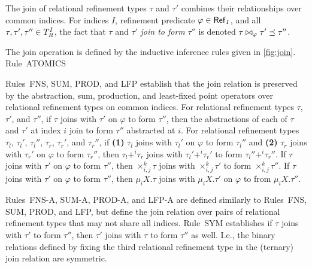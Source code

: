 The join of relational refinement types $\tau$ and $\tau'$ combines
their relationships over common indices.
%
For indices $I$, refinement predicate $\varphi \in \mathsf{Ref}_{I}$, and
all $\tau, \tau', \tau'' \in T_{R}^{I}$, the fact that $\tau$ and
$\tau'$ \emph{join to form} $\tau''$ is denoted
$\tau \bowtie_{ \varphi } \tau' \preceq \tau''$.

The join operation is defined by the inductive inference rules given
in \autoref{fig:join}.
Rule~ATOMICS
%

Rules~FNS, SUM, PROD, and LFP establish that the join relation is
preserved by the abstraction, sum, production, and least-fixed point
operators over relational refinement types on common indices.
%
For relational refinement types $\tau$, $\tau'$, and $\tau''$, if
$\tau$ joins with $\tau'$ on $\varphi$ to form $\tau''$, then the
abstractions of each of $\tau$ and $\tau'$ at index $i$ join to form
$\tau''$ abstracted at $i$.
For relational refinement types $\tau_l$, $\tau_l'$, $\tau_l''$,
$\tau_r$, $\tau_r'$, and $\tau_r''$, if %
\textbf{(1)} $\tau_l$ joins with $\tau_l'$ on $\varphi$ to form
$\tau_l''$ and %
\textbf{(2)} $\tau_r$ joins with $\tau_r'$ on $\varphi$ to form
$\tau_r''$, then $\tau_l +^i \tau_r$ joins with $\tau_l' +^i \tau_r'$
to form $\tau_l'' +^i \tau_r''$.
If $\tau$ joins with $\tau'$ on $\varphi$ to form $\tau''$, then %
$\times_{i, j}^k \tau$ joins with $\times_{i, j}^k \tau'$ to form
$\times_{i, j}^k \tau''$.
If $\tau$ joins with $\tau'$ on $\varphi$ to form $\tau''$, then %
$\mu_i X. \tau$ joins with $\mu_i X. \tau'$ on $\varphi$ to from
$\mu_i X. \tau''$.

Rules~FNS-A, SUM-A, PROD-A, and LFP-A are defined similarly to
Rules~FNS, SUM, PROD, and LFP, but define the join relation over pairs
of relational refinement types that may not share all indices.
%
Rule~SYM establishes if $\tau$ joins with $\tau'$ to form $\tau''$,
then $\tau'$ joins with $\tau$ to form $\tau''$ as well.
%
I.e., the binary relations defined by fixing the third relational
refinement type in the (ternary) join relation are symmetric.

